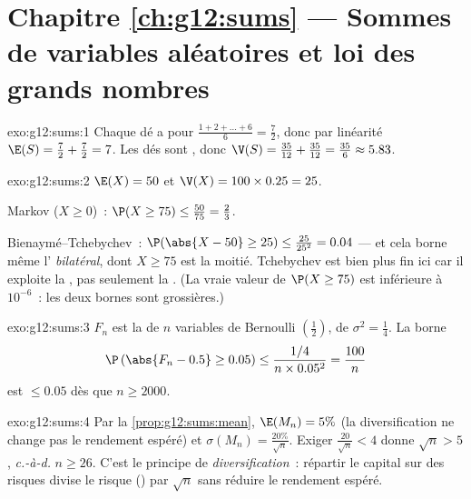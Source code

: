 \section*{Chapitre \ref{ch:g12:sums} --- Sommes de variables aléatoires et loi des grands nombres}

\begin{solution}{exo:g12:sums:1}
Chaque dé a pour 
$\frac{1 + 2 + \dots + 6}{6} = \frac{7}{2}$, donc par linéarité
$\E(S) = \frac72 + \frac72 = 7$. Les dés sont , donc
$\V(S) = \frac{35}{12} + \frac{35}{12} = \frac{35}{6} \approx 5.83$.
\end{solution}

\begin{solution}{exo:g12:sums:2}
$\E(X) = 50$ et $\V(X) = 100 \times 0.25 = 25$.

Markov ($X \geq 0$)~: $\P(X \geq 75) \leq \frac{50}{75} = \frac23$.

Bienaymé--Tchebychev~:
$\P(\abs{X - 50} \geq 25) \leq \frac{25}{25^2} = 0.04$ --- et cela borne
même l' \emph{bilatéral}, dont $X \geq 75$ est la moitié.
Tchebychev est bien plus fin ici car il exploite la , pas seulement
la . (La vraie valeur de $\P(X \geq 75)$ est inférieure à
$10^{-6}$~: les deux bornes sont grossières.)
\end{solution}

\begin{solution}{exo:g12:sums:3}
$F_n$ est la  de $n$ variables de Bernoulli
$\left(\frac12\right)$, de  $\sigma^2 = \frac14$. La borne
\[
\P\left(\abs{F_n - 0.5} \geq 0.05\right)
\leq \frac{1/4}{n \times 0.05^2} = \frac{100}{n}
\]
est $\leq 0.05$ dès que $n \geq 2000$.
\end{solution}

\begin{solution}{exo:g12:sums:4}
Par la \cref{prop:g12:sums:mean}, $\E(M_n) = 5\%$ (la diversification ne
change pas le rendement espéré) et
$\sigma(M_n) = \frac{20\%}{\sqrt n}$. Exiger
$\frac{20}{\sqrt n} < 4$ donne $\sqrt n > 5$, \emph{c.-à-d.} $n \geq 26$.
C'est le principe de \emph{diversification}~: répartir le capital sur des
risques  divise le risque () par $\sqrt n$ sans
réduire le rendement espéré.
\end{solution}

